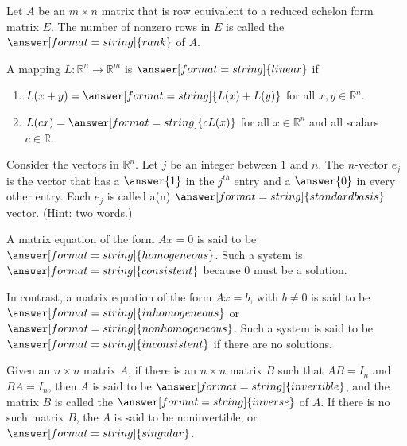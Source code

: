 \documentclass{ximera}
\begin{document}
\begin{question}
Let $A$ be an $m \times n$ matrix that is row equivalent to a reduced echelon form matrix $E$. 
The number of nonzero rows in $E$ is called the $\answer[format=string]{rank}$ of $A$.
\end{question} 

\begin{question}
A mapping $L: \mathbb{R}^n \to \mathbb{R}^m$ is $\answer[format=string]{linear}$ if 
\begin{enumerate}
\item $L(x+y)=\answer[format=string]{L(x)+L(y)}$ for all $x,y\in \mathbb{R}^n$. 
\item $L(cx)=\answer[format=string]{cL(x)}$ for all $x\in \mathbb{R}^n$ and all scalars $c\in \mathbb{R}$.
\end{enumerate}
\end{question} 

\begin{question}
Consider the vectors in $\mathbb{R}^n$.  Let $j$ be an integer between $1$ and $n$. The $n$-vector $e_j$ is the vector that has a $\answer{1}$ in the $j^{th}$ entry and a $\answer{0}$ in every other entry. Each $e_j$ is called a(n) $\answer[format=string]{standard basis}$ vector.  (Hint: two words.)  
\end{question} 

\begin{question}
A matrix equation of the form $Ax=0$ is said to be $\answer[format=string]{homogeneous}$.  Such a system is $\answer[format=string]{consistent}$ because $0$ must be a solution.  

In contrast, a matrix equation of the form $Ax=b$, with $b\ne 0$ is said to be $\answer[format=string]{inhomogeneous}$ or $\answer[format=string]{nonhomogeneous}$.  Such a system is said to be $\answer[format=string]{inconsistent}$ if there are no solutions.  
\end{question}

\begin{question}
Given an $n \times n$ matrix $A$, if there is an $n \times n$ matrix $B$ such that 
$AB=I_n$ and $BA=I_n$, then $A$ is said to be $\answer[format=string]{invertible}$, and the matrix $B$ is called the $\answer[format=string]{inverse}$ of $A$. If there is no such matrix $B$, the $A$ is said to be noninvertible, or $\answer[format=string]{singular}$. 
\end{question} 
\end{document}
